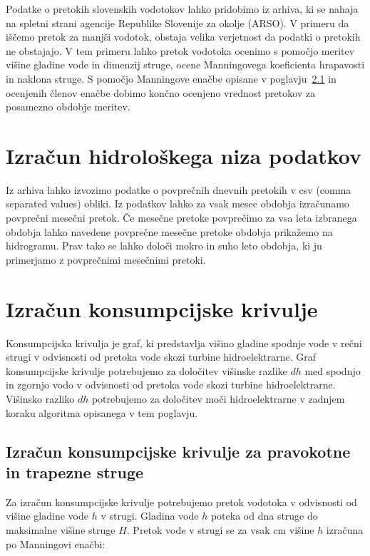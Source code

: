  
 
  Podatke o pretokih slovenskih vodotokov lahko pridobimo iz arhiva, ki se nahaja na spletni strani agencije Republike Slovenije za okolje (ARSO). V primeru da iščemo pretok za manjši vodotok, obstaja velika verjetnost da podatki o pretokih ne obstajajo. V tem primeru lahko pretok vodotoka ocenimo s pomočjo meritev višine gladine vode in dimenzij struge, ocene Manningovega koeficienta hrapavosti in naklona struge. S pomočjo Manningove enačbe opisane v poglavju~\ref{sec:teorija_trapeznaMetoda} in ocenjenih členov enačbe dobimo končno ocenjeno vrednost pretokov za posamezno obdobje meritev.




\section{Izračun hidrološkega niza podatkov}
Iz arhiva lahko izvozimo podatke o povprečnih dnevnih pretokih v csv (comma separated values) obliki. Iz podatkov lahko za vsak mesec obdobja izračunamo povprečni mesečni pretok. Če mesečne pretoke povprečimo za vsa leta izbranega obdobja lahko navedene povprečne mesečne pretoke obdobja prikažemo na hidrogramu. Prav tako se lahko določi mokro in suho leto obdobja, ki ju primerjamo z povprečnimi mesečnimi pretoki.



\section{Izračun konsumpcijske krivulje}
Konsumpcijska krivulja je graf, ki predstavlja višino gladine spodnje vode v rečni strugi v odvisnosti od pretoka vode skozi turbine hidroelektrarne. Graf konsumpcijske krivulje potrebujemo za določitev višinske razlike $dh$ med spodnjo in zgornjo vodo v odvisnosti od pretoka vode skozi turbine hidroelektrarne. Višinsko razliko $dh$ potrebujemo za določitev moči hidroelektrarne v zadnjem koraku algoritma opisanega v tem poglavju.



\subsection{Izračun konsumpcijske krivulje za pravokotne in trapezne struge} \label{sec:teorija_trapeznaMetoda}
Za izračun konsumpcijske krivulje potrebujemo pretok vodotoka v odvisnosti od višine gladine vode $h$ v strugi. Gladina vode $h$ poteka od dna struge do maksimalne višine struge $H$. Pretok vode v strugi se za vsak cm višine $h$ izračuna po Manningovi enačbi:

